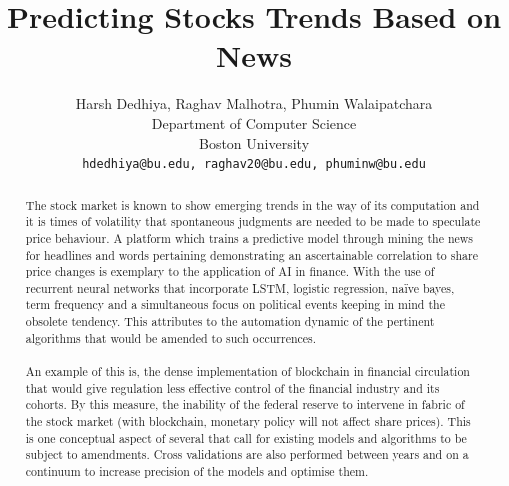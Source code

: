 \documentclass{article}
\title{Predicting Stocks Trends Based on News}
\author{
Harsh Dedhiya, Raghav Malhotra, Phumin Walaipatchara\\
Department of Computer Science\\
Boston University\\
\texttt{hdedhiya@bu.edu, raghav20@bu.edu, phuminw@bu.edu}\\
}
\begin{document}
\maketitle
\begin{abstract}
The stock market is known to show emerging trends in the way of its computation and it is times
 of volatility that spontaneous judgments are needed to be made to speculate price behaviour.
 A platform which trains a predictive model through mining the news for headlines and words
 pertaining demonstrating an ascertainable correlation to share price changes is exemplary to
 the application of AI in finance. With the use of recurrent neural networks that incorporate LSTM,
 logistic regression, naïve bayes, term frequency and a simultaneous focus on political events keeping
 in mind the obsolete tendency. This attributes to the automation dynamic of the pertinent algorithms
 that would be amended to such occurrences.
 \\\\
 An example of this is, the dense implementation of blockchain in financial circulation that would
 give regulation less effective control of the financial industry and its cohorts. By this measure,
 the inability of the federal reserve to intervene in fabric of the stock market (with blockchain,
 monetary policy will not affect share prices). This is one conceptual aspect of several that call for
 existing models and algorithms to be subject to amendments. Cross validations are also performed between
 years and on a continuum to increase precision of the models and optimise them.
\end{abstract}
\end{document}
